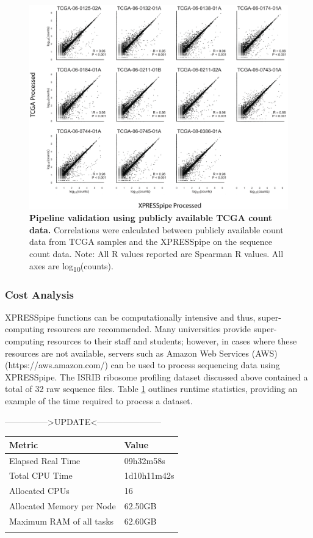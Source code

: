 \documentclass[10pt, oneside]{article}
\begin{document}
\begin{figure}
\centering
  \includegraphics[width=180mm]{figures/xpresspipe_figure4.png}
  \caption{\textbf{Pipeline validation using publicly available TCGA count data.} Correlations were calculated between publicly available count data from TCGA samples and the XPRESSpipe on the sequence count data. Note: All R values reported are Spearman R values. All axes are log\textsubscript{10}(counts).}
  \label{fig:figure4}
\end{figure}


\subsubsection{Cost Analysis}
XPRESSpipe functions can be computationally intensive and thus, super-computing resources are recommended. Many universities provide super-computing resources to their staff and students; however, in cases where these resources are not available, servers such as Amazon Web Services (AWS) (https://aws.amazon.com/) can be used to process sequencing data using XPRESSpipe. The ISRIB ribosome profiling dataset discussed above contained a total of 32 raw sequence files. Table \ref{tab:chpc_performance} outlines runtime statistics, providing an example of the time required to process a dataset.

--------------->UPDATE<-----------------------
\begin{table}[!]
    \centering
{}
\begin{tabular}{p{5cm}p{3cm}}
\textbf{Metric} & \textbf{Value} \\
\hline
 Elapsed Real Time & 09h32m58s \\
 \hline
 Total CPU Time & 1d10h11m42s \\
 \hline
 Allocated CPUs & 16 \\
 \hline
 Allocated Memory per Node & 62.50GB \\
 \hline
 Maximum RAM of all tasks & 62.60GB \\
 \label{tab:chpc_performance}
\end{tabular}
\end{table}
\end{document}
